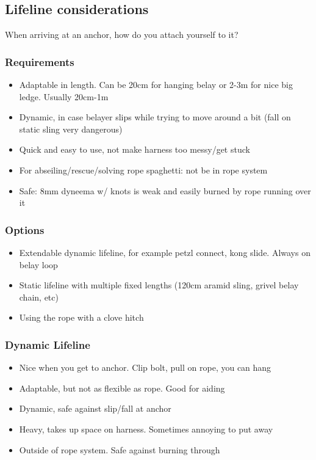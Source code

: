 \newpage
\subsection{Lifeline considerations}
When arriving at an anchor, how do you attach yourself to it?
\subsubsection{Requirements}
\begin{itemize}
\item Adaptable in length. Can be 20cm for hanging belay or 2-3m for nice big ledge. Usually 20cm-1m
\item Dynamic, in case belayer slips while trying to move around a bit (fall on static sling very dangerous)
\item Quick and easy to use, not make harness too messy/get stuck
\item For abseiling/rescue/solving rope spaghetti: not be in rope system
\item Safe: 8mm dyneema w/ knots is weak and easily burned by rope running over it
\end{itemize} 

\subsubsection{Options}
\begin{itemize}
\item Extendable dynamic lifeline, for example petzl connect, kong slide. Always on belay loop
\item Static lifeline with multiple fixed lengths (120cm aramid sling, grivel belay chain, etc)
\item Using the rope with a clove hitch
\end{itemize} 


\subsubsection{Dynamic Lifeline}
\begin{itemize}
\item Nice when you get to anchor. Clip bolt, pull on rope, you can hang
\item Adaptable, but not as flexible as rope. Good for aiding
\item Dynamic, safe against slip/fall at anchor
\item Heavy, takes up space on harness. Sometimes annoying to put away
\item Outside of rope system. Safe against burning through
\end{itemize}

